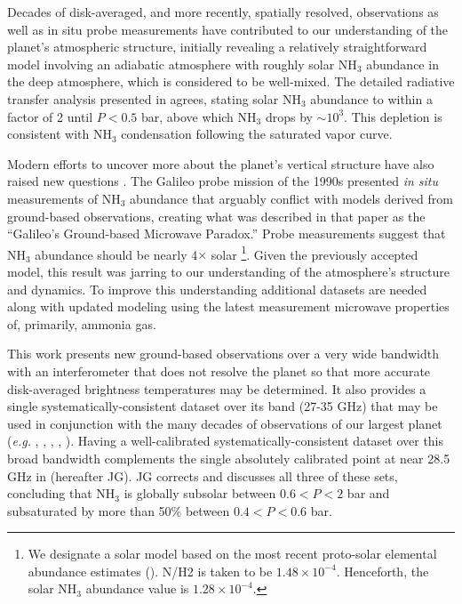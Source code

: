 \documentclass{article}
\newcommand{\e}[1]{\times 10^{#1}}
\begin{document}
	Decades of disk-averaged, and more recently, spatially resolved, observations as well as in situ probe measurements have contributed to our understanding of the planet's atmospheric structure,
	initially revealing a relatively straightforward model involving an adiabatic atmosphere with roughly solar NH$_{3}$ abundance in the deep atmosphere, which is considered to be well-mixed.
	The detailed radiative transfer analysis presented in \citealt{1985Icar...62..143D} agrees, stating solar NH$_{3}$ abundance to within a factor of 2 until $P < 0.5$ bar, above which NH$_{3}$ drops by $\sim 10^{3}$.
	This depletion is consistent with NH$_{3}$ condensation following the saturated vapor curve.

	Modern efforts to uncover more about the planet's vertical structure have also raised new questions \citep{2005Icar..173..425D}.
	The Galileo probe mission of the 1990s presented {\sl in situ} measurements of NH$_{3}$ abundance that arguably conflict with models derived from ground-based observations, creating what was described in that paper as the ``Galileo's Ground-based Microwave Paradox.''
	Probe measurements suggest that NH$_{3}$ abundance should be nearly 4$\times$ solar
		\footnote{We designate a solar model based on the most recent proto-solar elemental abundance estimates (\citealt{2009ARA&A..47..481A}). N/H2 is taken to be $1.48 \e{-4}$. Henceforth, the solar NH$_{3}$ abundance value is $1.28 \e{-4}$.}. 
	Given the previously accepted model, this result was jarring to our understanding of the atmosphere's structure and dynamics.  To improve this understanding additional datasets are needed along with updated modeling using the latest measurement microwave properties of, primarily, ammonia gas.

	This work presents new ground-based observations over a very wide bandwidth with an interferometer that does not resolve the planet so that more accurate disk-averaged brightness temperatures may be determined.  It also provides a single systematically-consistent dataset over its band (27-35 GHz) that may be used in conjunction with the many decades of observations of our largest planet ({\em e.g.} \citealt{1978Icar...35...44K}, \citealt{2003ApJS..148...39P}, \citealt{2011ApJS..192...19W}, \citealt{2005Icar..173..439G}, \citealt{2016Sci...352.1198D}).
	Having a well-calibrated systematically-consistent dataset over this broad bandwidth complements the single absolutely calibrated point at near 28.5 GHz in \citealt{2005Icar..173..439G} (hereafter JG).
	 JG corrects and discusses all three of these sets, concluding that NH$_{3}$ is globally subsolar between $0.6 < P < 2$ bar and subsaturated by more than 50\% between $0.4 < P < 0.6$ bar.
	 
\end{document}
